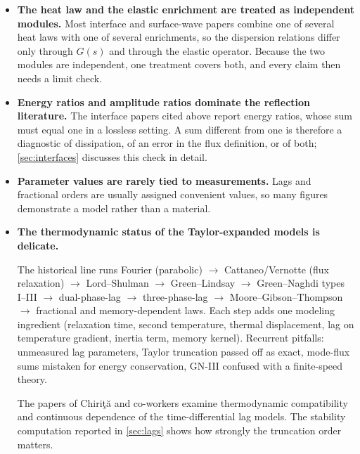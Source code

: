 \begin{itemize}
\item \textbf{The heat law and the elastic enrichment are treated as independent modules.} Most interface and surface-wave papers combine one of several heat laws with one of several enrichments, so the dispersion relations differ only through $G(s)$ and through the elastic operator. Because the two modules are independent, one treatment covers both, and every claim then needs a limit check.
\item \textbf{Energy ratios and amplitude ratios dominate the reflection literature.} The interface papers cited above report energy ratios, whose sum must equal one in a lossless setting. A sum different from one is therefore a diagnostic of dissipation, of an error in the flux definition, or of both; \cref{sec:interfaces} discusses this check in detail.
\item \textbf{Parameter values are rarely tied to measurements.} Lags and fractional orders are usually assigned convenient values, so many figures demonstrate a model rather than a material.
\item \textbf{The thermodynamic status of the Taylor-expanded models is delicate.}

\begin{summarybox}[Summary]
The historical line runs Fourier (parabolic) $\to$ Cattaneo/Vernotte (flux relaxation) $\to$ Lord--Shulman $\to$ Green--Lindsay $\to$ Green--Naghdi types I--III $\to$ dual-phase-lag $\to$ three-phase-lag $\to$ Moore--Gibson--Thompson $\to$ fractional and memory-dependent laws. Each step adds one modeling ingredient (relaxation time, second temperature, thermal displacement, lag on temperature gradient, inertia term, memory kernel). Recurrent pitfalls: unmeasured lag parameters, Taylor truncation passed off as exact, mode-flux sums mistaken for energy conservation, GN-III confused with a finite-speed theory.
\end{summarybox} The papers of Chiri\c{t}\u{a} and co-workers \citep{Chirita2016,Tibullo2017} examine thermodynamic compatibility and continuous dependence of the time-differential lag models. The stability computation reported in \cref{sec:lags} shows how strongly the truncation order matters.
\end{itemize}
